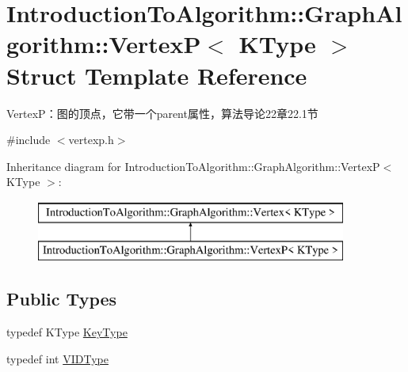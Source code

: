 \hypertarget{struct_introduction_to_algorithm_1_1_graph_algorithm_1_1_vertex_p}{}\section{Introduction\+To\+Algorithm\+:\+:Graph\+Algorithm\+:\+:Vertex\+P$<$ K\+Type $>$ Struct Template Reference}
\label{struct_introduction_to_algorithm_1_1_graph_algorithm_1_1_vertex_p}


Vertex\+P：图的顶点，它带一个parent属性，算法导论22章22.1节  




{\ttfamily \#include $<$vertexp.\+h$>$}

Inheritance diagram for Introduction\+To\+Algorithm\+:\+:Graph\+Algorithm\+:\+:Vertex\+P$<$ K\+Type $>$\+:\begin{figure}[H]
\begin{center}
\leavevmode
\includegraphics[height=2.000000cm]{struct_introduction_to_algorithm_1_1_graph_algorithm_1_1_vertex_p}
\end{center}
\end{figure}
\subsection*{Public Types}
\begin{DoxyCompactItemize}
\item 
typedef K\+Type \hyperlink{struct_introduction_to_algorithm_1_1_graph_algorithm_1_1_vertex_p_aa48c040b6a076ae4e1cbd5cd51f42241}{Key\+Type}
\item 
typedef int \hyperlink{struct_introduction_to_algorithm_1_1_graph_algorithm_1_1_vertex_p_aa15e0b509772ea84c9b5a211079d641b}{V\+I\+D\+Type}
\end{DoxyCompactItemize}
